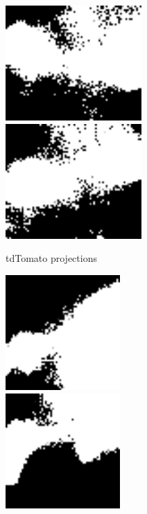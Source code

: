 \begin{figure}
	\vspace{20pt}

	\begin{subfigure}[b]{0.3\textwidth}
		\centering
		\includegraphics[width=0.57\textwidth]{tdTomato_projections_1} \\[2pt]
		\includegraphics[width=0.57\textwidth]{tdTomato_projections_2}
		\caption{tdTomato projections}
		\label{fig:tdtomato_projections}
	\end{subfigure}
	\quad%
	\begin{subfigure}[b]{0.3\textwidth}
		\centering
		\includegraphics[width=0.48\textwidth]{mScarlet_projections_1} \\[2pt]
		\includegraphics[width=0.48\textwidth]{mScarlet_projections_2}

\end{subfigure}
\end{figure}

